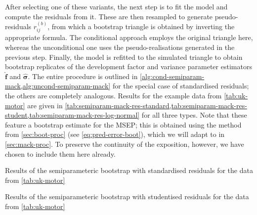 \documentclass[a4paper]{book}
\begin{document}
After selecting one of these variants, the next step is to fit the model and compute the residuals from it. These are then resampled to generate pseudo-residuals $r^{(b)}_{ij}$, from which a bootstrap triangle is obtained by inverting the appropriate formula. The conditional approach employs the original triangle here, whereas the unconditional one uses the pseudo-realisations generated in the previous step. Finally, the model is refitted to the simulated triangle to obtain bootstrap replicates of the development factor and variance parameter estimators $\widehat{\bm{f}}$ and $\widehat{\bm{\sigma}}$. The entire procedure is outlined in \cref{alg:cond-semiparam-mack,alg:uncond-semiparam-mack} for the special case of standardised residuals; the others are completely analogous. Results for the example data from \cref{tab:uk-motor} are given in \cref{tab:semiparam-mack-res-standard,tab:semiparam-mack-res-student,tab:semiparam-mack-res-log-normal} for all three types. Note that these feature a bootstrap estimate for the MSEP; this is obtained using the method from \cref{sec:boot-proc} (see \cref{eq:pred-error-boot}), which we will adapt to  in \cref{sec:mack-proc}. To preserve the continuity of the exposition, however, we have chosen to include them here already.

\begin{table}[!htb]
  \begin{subtable}{0.5\linewidth}
    
  \end{subtable}
  \hfill
  \begin{subtable}{0.5\linewidth}
    
  \end{subtable}
  \caption{Results of the semiparameteric bootstrap with standardised residuals for the data from \cref{tab:uk-motor}}
  \label{tab:semiparam-mack-res-standard}
\end{table}

\begin{table}[!htb]
  \begin{subtable}{0.5\linewidth}
    
  \end{subtable}
  \hfill
  \begin{subtable}{0.5\linewidth}
    
  \end{subtable}
  \caption{Results of the semiparameteric bootstrap with studentised residuals for the data from \cref{tab:uk-motor}}
  \label{tab:semiparam-mack-res-student}
\end{table}
\end{document}
